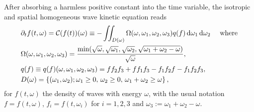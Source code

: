 \documentclass[reqno,11pt,letterpaper]{amsart}
\numberwithin{equation}{section}
\newcommand{\dd}{\, {\rm d}}
\newcommand{\RR}{{\mathbb R}}
\begin{document}
After absorbing a harmless positive constant into the time
variable, the isotropic and spatial homogeneous  wave kinetic equation reads 
\begin{equation}\label{eq:NL evolution1}
\begin{split}
    &\partial_t f(t,\omega) = \mathcal{C}(f(t))(\omega )\equiv -
     \iint_{D(\omega)}\Omega (\omega , \omega _1, \omega _2, \omega _3) q(f)\dd\omega _1 \dd\omega _2 \quad \text{ where} \\ 
&\Omega (\omega , \omega _1, \omega _2, \omega _3)= \frac{\text{min}(\sqrt{\omega},\sqrt{\omega_1},\sqrt{\omega_2},\sqrt{\omega_1+\omega_2-\omega})}{\sqrt{\omega}}, \\
    & q(f) \equiv q(f)(\omega , \omega _1, \omega _2, \omega _3) =  f f_2 f_3 + f f_1 f_3 - f_1 f_2 f - f_1 f_2 f_3,   \\
  &D(\omega ) = \left\{(\omega _1, \omega _2); \omega _1\ge 0,\,\omega _2\ge 0,\,\omega _1+\omega _2\ge \omega  \right\},
 \end{split}
\end{equation}
for $f(t, \omega)$ the  density of waves with energy $\omega$,  
with the usual notation $f=f(t, \omega )$, $f_i=f(t, \omega _i)$ for $i=1, 2, 3$ and    $\omega _3:= \omega_1+ \omega_2-\omega$.


\end{document}
